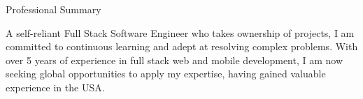 \documentclass{resume} %
\begin{document}

\begin{rSection}{Professional Summary}

{A self-reliant Full Stack Software Engineer who takes ownership of projects, I am committed to continuous learning and adept at resolving complex problems. With over 5 years of experience in full stack web and mobile development, I am now seeking global opportunities to apply my expertise, having gained valuable experience in the USA.}

\end{rSection}

\end{document}
